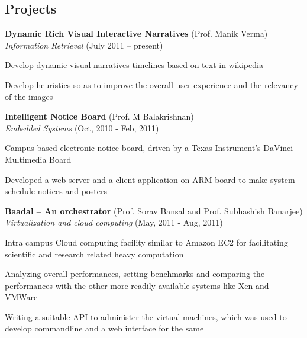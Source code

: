 \documentclass[margin,line]{resume}
\begin{document}
\begin{resume}
    \section{\mysidestyle Projects}

    \textbf{Dynamic Rich Visual Interactive Narratives}   \hfill(Prof. Manik Verma)\vspace{1mm}\\\vspace{1mm}%
    \textsl{Information Retrieval}                        \hfill(July 2011 -- present)
    \begin{list2}
        \item Develop dynamic visual narratives timelines based on text in wikipedia
        \item Develop heuristics so as to improve the overall user experience and the relevancy of the images
    \end{list2}

    \textbf{Intelligent Notice Board}                           \hfill(Prof. M Balakrishnan)\vspace{1mm}\\\vspace{1mm}%
    \textsl{Embedded Systems}                                   \hfill(Oct, 2010 - Feb, 2011)
    \begin{list2}
        \item Campus based electronic notice board, driven by a Texas Instrument's DaVinci Multimedia Board
        \item Developed a web server and a client application on ARM board to make system schedule notices and posters
    \end{list2}

    \textbf{Baadal – An orchestrator}                           \hfill(Prof. Sorav Bansal and Prof. Subhashish Banarjee)\vspace{1mm}\\\vspace{1mm}%
    \textsl{Virtualization and cloud computing}                 \hfill(May, 2011 - Aug, 2011)
    \begin{list2}
        \item Intra campus Cloud computing facility similar to Amazon EC2 for facilitating scientific and research related
heavy computation
        \item Analyzing overall performances, setting benchmarks and comparing the performances with the other more
readily available systems like Xen and VMWare
        \item Writing a suitable API to administer the virtual machines, which was used to develop commandline and a web
interface for the same
    \end{list2}


\end{resume}
\end{document}

